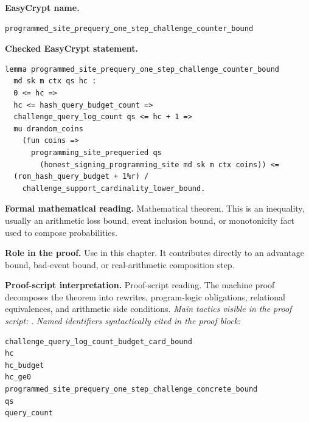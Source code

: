 \begin{formaltheorem}
\noindent\textbf{EasyCrypt name.}
\begin{lstlisting}[language=EasyCrypt,basicstyle=\ttfamily\scriptsize]
programmed_site_prequery_one_step_challenge_counter_bound
\end{lstlisting}
\noindent\textbf{Checked EasyCrypt statement.}
\begin{lstlisting}[language=EasyCrypt,basicstyle=\ttfamily\scriptsize]
lemma programmed_site_prequery_one_step_challenge_counter_bound
  md sk m ctx qs hc :
  0 <= hc =>
  hc <= hash_query_budget_count =>
  challenge_query_log_count qs <= hc + 1 =>
  mu drandom_coins
    (fun coins =>
      programming_site_prequeried qs
        (honest_signing_programming_site md sk m ctx coins)) <=
  (rom_hash_query_budget + 1%r) /
    challenge_support_cardinality_lower_bound.
\end{lstlisting}
\noindent\textbf{Formal mathematical reading.}
Mathematical theorem. This is an inequality, usually an arithmetic loss bound, event inclusion bound, or monotonicity fact used to compose probabilities.

\noindent\textbf{Role in the proof.}
Use in this chapter. It contributes directly to an advantage bound, bad-event bound, or real-arithmetic composition step.

\noindent\textbf{Proof-script interpretation.}
Proof-script reading. The machine proof decomposes the theorem into rewrites, program-logic obligations, relational equivalences, and arithmetic side conditions.
\emph{Main tactics visible in the proof script:} .
\emph{Named identifiers syntactically cited in the proof block:}
\begin{lstlisting}[language=EasyCrypt,basicstyle=\ttfamily\scriptsize]
challenge_query_log_count_budget_card_bound
hc
hc_budget
hc_ge0
programmed_site_prequery_one_step_challenge_concrete_bound
qs
query_count
\end{lstlisting}

\end{formaltheorem}


